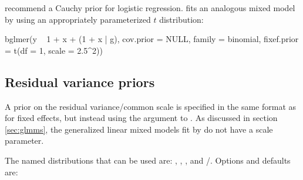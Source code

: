 \documentclass[article,shortnames]{jss}
\begin{document}
\citet{gelman:2008:weakly_informative} recommend a Cauchy prior for logistic
regression.  fits an analogous mixed model by using an appropriately
parameterized $t$ distribution:

\begin{Code}
bglmer(y ~ 1 + x + (1 + x | g), cov.prior = NULL,
       family = binomial,
       fixef.prior = t(df = 1, scale = 2.5^2))
\end{Code}

\subsection{Residual variance priors}
\label{sec:blme:residPrior}

A prior on the residual variance/common scale is specified in the same
format as for fixed effects, but instead using the  argument to
. As discussed in section \ref{sec:glmms}, the generalized
linear mixed models fit by  do not have a scale parameter.

The named distributions that can be used are: ,
, , and /. Options and defaults are:
\end{document}
